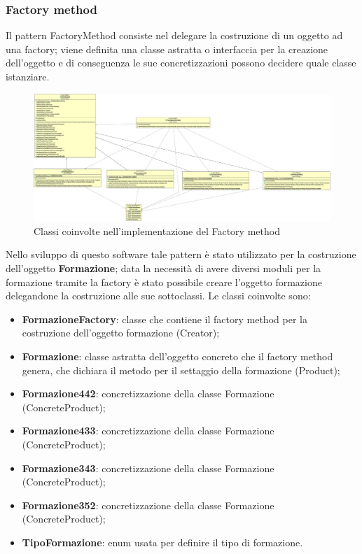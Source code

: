 \documentclass[12pt,a4paper]{article}
\begin{document}
\subsubsection{Factory method}
Il pattern FactoryMethod consiste nel delegare la costruzione di un oggetto ad una factory; viene definita una classe astratta o interfaccia per la creazione dell'oggetto e di conseguenza le sue concretizzazioni possono decidere quale classe istanziare.
\begin{figure}[h]
\centering
\includegraphics[width=18 cm ,keepaspectratio]{Factory.jpg}
\caption{Classi coinvolte nell'implementazione del Factory method}
\end{figure}
\newline
Nello sviluppo di questo software tale pattern è stato utilizzato per la costruzione dell'oggetto \textbf{Formazione}; data la necessità di avere diversi moduli per la formazione tramite la factory è stato possibile creare l'oggetto formazione delegandone la costruzione alle sue sottoclassi. Le classi coinvolte sono:  
\begin{itemize}
\item \textbf{FormazioneFactory}: classe che contiene il factory method per la costruzione dell'oggetto formazione (Creator);
\item \textbf{Formazione}: classe astratta dell'oggetto concreto che il factory method genera, che dichiara il metodo per il settaggio della formazione (Product);
\item \textbf{Formazione442}: concretizzazione della classe Formazione  (ConcreteProduct);
\item \textbf{Formazione433}: concretizzazione della classe Formazione  (ConcreteProduct);
\item \textbf{Formazione343}: concretizzazione della classe Formazione  (ConcreteProduct);
\item \textbf{Formazione352}: concretizzazione della classe Formazione  (ConcreteProduct);
\item \textbf{TipoFormazione}: enum usata per definire il tipo di formazione.
\end{itemize}
\newpage
\end{document}
